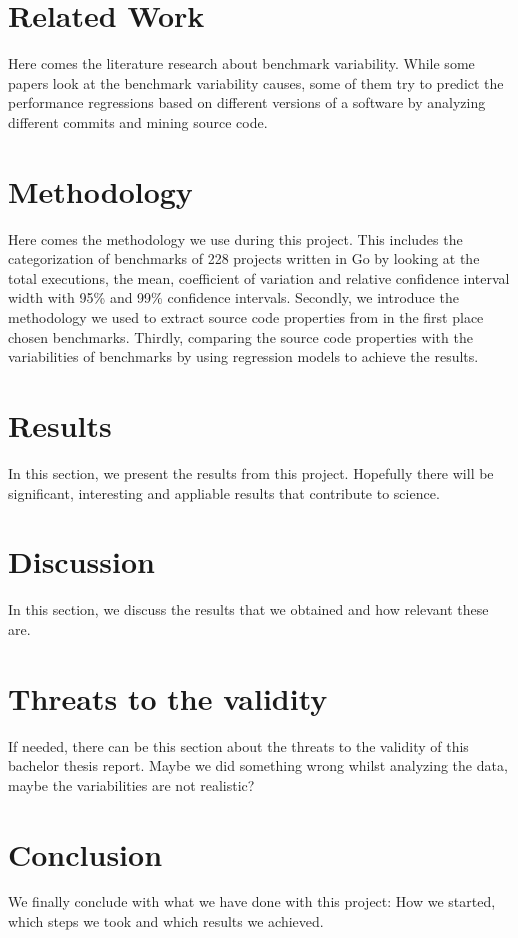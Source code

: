 \documentclass{seal_thesis}
\begin{document}
\chapter{Related Work}
Here comes the literature research about benchmark variability. While some papers look at the benchmark variability causes, some of them try to predict the performance regressions based on different versions of a software by analyzing different commits and mining source code.

\chapter{Methodology}
Here comes the methodology we use during this project. This includes the categorization of benchmarks of 228 projects written in Go by looking at the total executions, the mean, coefficient of variation and relative confidence interval width with 95\% and 99\% confidence intervals. Secondly, we introduce the methodology we used to extract source code properties from in the first place chosen benchmarks. Thirdly, comparing the source code properties with the variabilities of benchmarks by using regression models to achieve the results.

\chapter{Results}
In this section, we present the results from this project. Hopefully there will be  significant, interesting and appliable results that contribute to science.

\chapter{Discussion}
In this section, we discuss the results that we obtained and how relevant these are.

\chapter{Threats to the validity}
If needed, there can be this section about the threats to the validity of this bachelor thesis report. Maybe we did something wrong whilst analyzing the data, maybe the variabilities are not realistic?

\chapter{Conclusion}
We finally conclude with what we have done with this project: How we started, which steps we took and which results we achieved.


\backmatter


\end{document}
